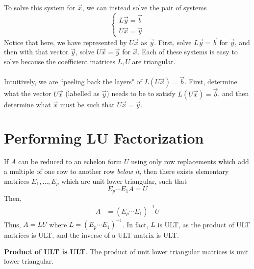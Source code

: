 \documentclass[letterpaper,12pt]{article}
\begin{document}
To solve this system for $\vec{x}$, we can instead solve the pair of systems
\begin{equation*}
    \begin{cases} L\vec{y} = \vec{b} \\ U\vec{x} = \vec{y} \end{cases}
\end{equation*}
Notice that here, we have represented by $U\vec{x}$ as $\vec{y}$. First, solve $L\vec{y} = \vec{b}$ for $\vec{y}$, and then with that vector $\vec{y}$, solve $U\vec{x} = \vec{y}$ for $\vec{x}$. Each of these systems is easy to solve because the coefficient matrices $L, U$ are triangular.
\\ \\ Intuitively, we are ``peeling back the layers" of $L(U\vec{x}) = \vec{b}$. First, determine what the vector $U\vec{x}$ (labelled as $\vec{y}$) needs to be to satisfy $L(U\vec{x}) = \vec{b}$, and then determine what $\vec{x}$ must be such that $U\vec{x} = \vec{y}$.

\section*{Performing LU Factorization}
If $A$ can be reduced to an echelon form $U$ using only row replacements which add a multiple of one row to another row \textit{below it}, then there exists elementary matrices $E_1, \dots, E_p$ which are unit lower triangular, such that
\begin{equation*}
    E_p \cdots E_1 A = U
\end{equation*}
Then,
\begin{align*}
    A & = (E_p \cdots E_1)^{-1} U
\end{align*}
Thus, $A = LU$ where $L = (E_p \cdots E_1)^{-1}$. In fact, $L$ is ULT, as the product of ULT matrices is ULT, and the inverse of a ULT matrix is ULT.

\begin{theorem}
\textbf{Product of ULT is ULT}. The product of unit lower triangular matrices is unit lower triangular.
\end{theorem}
\end{document}
